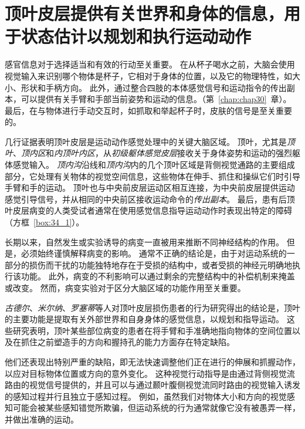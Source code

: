 \section{顶叶皮层提供有关世界和身体的信息，用于状态估计以规划和执行运动动作}

感官信息对于选择适当和有效的行动至关重要。
在从杯子喝水之前，大脑会使用视觉输入来识别哪个物体是杯子，它相对于身体的位置，以及它的物理特性，如大小、形状和手柄方向。
此外，通过整合四肢的本体感觉信号和运动指令的传出副本，可以提供有关手臂和手部当前姿势和运动的信息。（第~\ref{chap:chap30}~章）。
最后，在与物体进行手动交互时，如抓取和举起杯子时，皮肤的信号是至关重要的。


几行证据表明顶叶皮层是运动动作感觉处理中的关键大脑区域。
顶叶，尤其是\textit{顶叶}、\textit{顶内区}和\textit{内顶叶内区}，从\textit{初级躯体感觉皮层}接收关于身体姿势和运动的强烈躯体感觉输入。
\textit{顶内沟}沿线和\textit{顶内沟}内的几个顶叶区域是背侧视觉通路的主要组成部分，它处理有关物体的视觉空间信息，这些物体在伸手、抓住和操纵它们时引导手臂和手的运动。
顶叶也与中央前皮层运动区相互连接，为中央前皮层提供运动感觉引导信号，并从相同的中央前区接收运动命令的\textit{传出副本}。
最后，患有后顶叶皮层病变的人类受试者通常在使用感觉信息指导运动动作时表现出特定的障碍（方框~\ref{box:34_1}）。



\begin{proposition}[后顶叶皮层的病变研究导致使用感觉信息指导行动的缺陷] \label{box:34_1}
	
	\quad \quad 长期以来，自然发生或实验诱导的病变一直被用来推断不同神经结构的作用。
	但是，必须始终谨慎解释病变的影响。
	通常不正确的结论是，由于对运动系统的一部分的损伤而干扰的功能独特地存在于受损的结构中，或者受损的神经元明确地执行该功能。
	此外，病变的不利影响可以通过剩余的完整结构中的补偿机制来掩盖或改变。
	然而，病变实验对于区分大脑区域的功能作用至关重要。
	
	\quad \textit{古德尔}、\textit{米尔纳}、\textit{罗塞蒂}等人对顶叶皮层损伤患者的行为研究得出的结论是，顶叶的主要功能是提取有关外部世界和自身身体的感觉信息，以规划和指导运动。
	这些研究表明，顶叶某些部位病变的患者在将手臂和手准确地指向物体的空间位置以及在抓住之前塑造手的方向和握持孔的能力方面存在特定缺陷。
	
	\quad \quad 他们还表现出特别严重的缺陷，即无法快速调整他们正在进行的伸展和抓握动作，以应对目标物体位置或方向的意外变化。
	这种视觉行动指导是由通过背侧视觉流路由的视觉信号提供的，并且可以与通过颞叶腹侧视觉流同时路由的视觉输入诱发的感知过程并行且独立于感知过程。
	例如，虽然我们对物体大小和方向的视觉感知可能会被某些感知错觉所欺骗，但运动系统的行为通常就像它没有被愚弄一样，并做出准确的运动。
	
\end{proposition}



